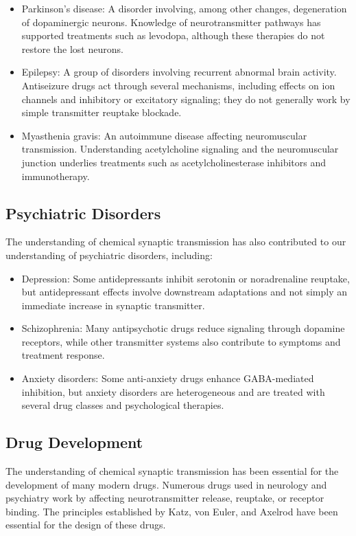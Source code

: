 \begin{itemize}
\item Parkinson's disease: A disorder involving, among other changes, degeneration of dopaminergic neurons. Knowledge of neurotransmitter pathways has supported treatments such as levodopa, although these therapies do not restore the lost neurons.
\item Epilepsy: A group of disorders involving recurrent abnormal brain activity. Antiseizure drugs act through several mechanisms, including effects on ion channels and inhibitory or excitatory signaling; they do not generally work by simple transmitter reuptake blockade.
\item Myasthenia gravis: An autoimmune disease affecting neuromuscular transmission. Understanding acetylcholine signaling and the neuromuscular junction underlies treatments such as acetylcholinesterase inhibitors and immunotherapy.
\end{itemize}

\subsection{Psychiatric Disorders}

The understanding of chemical synaptic transmission has also contributed to our understanding of psychiatric disorders, including:

\begin{itemize}
\item Depression: Some antidepressants inhibit serotonin or noradrenaline reuptake, but antidepressant effects involve downstream adaptations and not simply an immediate increase in synaptic transmitter.
\item Schizophrenia: Many antipsychotic drugs reduce signaling through dopamine receptors, while other transmitter systems also contribute to symptoms and treatment response.
\item Anxiety disorders: Some anti-anxiety drugs enhance GABA-mediated inhibition, but anxiety disorders are heterogeneous and are treated with several drug classes and psychological therapies.
\end{itemize}

\subsection{Drug Development}

The understanding of chemical synaptic transmission has been essential for the development of many modern drugs. Numerous drugs used in neurology and psychiatry work by affecting neurotransmitter release, reuptake, or receptor binding. The principles established by Katz, von Euler, and Axelrod have been essential for the design of these drugs.

